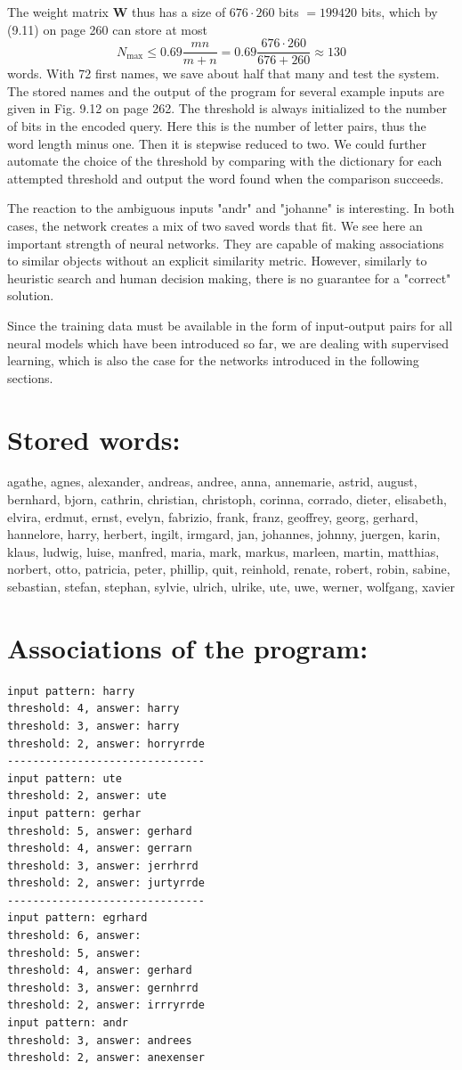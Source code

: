 \documentclass[10pt]{book}
\begin{document}
The weight matrix $\boldsymbol{W}$ thus has a size of $676 \cdot 260$ bits $=199420$ bits, which by (9.11) on page 260 can store at most
$$
N_{\max} \leq 0.69 \frac{m n}{m+n} = 0.69 \frac{676 \cdot 260}{676+260} \approx 130
$$
words. With 72 first names, we save about half that many and test the system. The stored names and the output of the program for several example inputs are given in Fig. 9.12 on page 262. The threshold is always initialized to the number of bits in the encoded query. Here this is the number of letter pairs, thus the word length minus one. Then it is stepwise reduced to two. We could further automate the choice of the threshold by comparing with the dictionary for each attempted threshold and output the word found when the comparison succeeds.

The reaction to the ambiguous inputs "andr" and "johanne" is interesting. In both cases, the network creates a mix of two saved words that fit. We see here an important strength of neural networks. They are capable of making associations to similar objects without an explicit similarity metric. However, similarly to heuristic search and human decision making, there is no guarantee for a "correct" solution.

Since the training data must be available in the form of input-output pairs for all neural models which have been introduced so far, we are dealing with supervised learning, which is also the case for the networks introduced in the following sections.

\section{Stored words:}
agathe, agnes, alexander, andreas, andree, anna, annemarie, astrid, august, bernhard, bjorn, cathrin, christian, christoph, corinna, corrado, dieter, elisabeth, elvira, erdmut, ernst, evelyn, fabrizio, frank, franz, geoffrey, georg, gerhard, hannelore, harry, herbert, ingilt, irmgard, jan, johannes, johnny, juergen, karin, klaus, ludwig, luise, manfred, maria, mark, markus, marleen, martin, matthias, norbert, otto, patricia, peter, phillip, quit, reinhold, renate, robert, robin, sabine, sebastian, stefan, stephan, sylvie, ulrich, ulrike, ute, uwe, werner, wolfgang, xavier
\section{Associations of the program:}
\begin{verbatim}
input pattern: harry
threshold: 4, answer: harry
threshold: 3, answer: harry
threshold: 2, answer: horryrrde
-------------------------------
input pattern: ute
threshold: 2, answer: ute
input pattern: gerhar
threshold: 5, answer: gerhard
threshold: 4, answer: gerrarn
threshold: 3, answer: jerrhrrd
threshold: 2, answer: jurtyrrde
-------------------------------
input pattern: egrhard
threshold: 6, answer:
threshold: 5, answer:
threshold: 4, answer: gerhard
threshold: 3, answer: gernhrrd
threshold: 2, answer: irrryrrde
input pattern: andr
threshold: 3, answer: andrees
threshold: 2, answer: anexenser
\end{verbatim}
\end{document}
